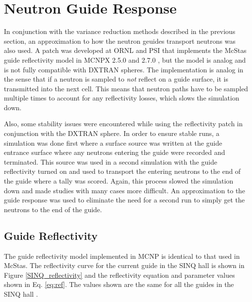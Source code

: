 \documentclass[a4paper]{jpconf}
\begin{document}
\section{Neutron Guide Response} 

In conjunction with the variance reduction methods described in the previous section, an approximation to how the neutron geuides transport neutrons was also used.  A patch was developed at ORNL and PSI that implements the McStas guide reflectivity model in MCNPX 2.5.0 and 2.7.0 \cite{mcnp_reflectivity, EK_reflectivity}, but the model is analog and is not fully compatible with DXTRAN spheres.  The implementation is analog in the sense that if a neutron is sampled to \emph{not} reflect on a guide surface, it is transmitted into the next cell.  This means that neutron paths have to be sampled multiple times to account for any reflectivity losses, which slows the simulation down.  

Also, some stability issues were encountered while using the reflectivity patch in conjunction with the DXTRAN sphere.  In order to ensure stable runs, a simulation was done first where a surface source was written at the guide entrance surface where any neutrons entering the guide were recorded and terminated.  This source was used in a second simulation with the guide reflectivity turned on and used to transport the entering neutrons to the end of the guide where a tally was scored.  Again, this process slowed the simulation down and made studies with many cases more difficult.  An approximation to the guide response was used to eliminate the need for a second run to simply get the neutrons to the end of the guide.


\subsection{Guide Reflectivity}

The guide reflectivity model implemented in MCNP is identical to that used in McStas.  The reflectivity curve for the current guide in the SINQ hall is shown in Figure \ref{SINQ_reflectivity} and the reflectivity equation and parameter values shown in Eq. \ref{eq:ref}.  The values shown are the same for all the guides in the SINQ hall \cite{SINQ_guide_values}.
\end{document}
